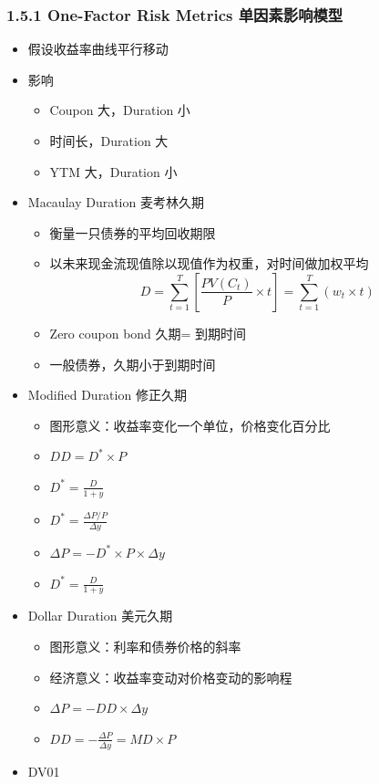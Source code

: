 \documentclass[a4paper,6pt,twoside,openany]{article}
\begin{document}
\subsubsection*{1.5.1 One-Factor Risk Metrics 单因素影响模型}
\begin{itemize}
\item 假设收益率曲线平行移动
\item 影响
  \begin{itemize}
  \item Coupon 大，Duration 小
  \item 时间长，Duration 大
  \item YTM 大，Duration 小
  \end{itemize}
\item Macaulay Duration 麦考林久期
  \begin{itemize}
  \item 衡量一只债券的平均回收期限
  \item 以未来现金流现值除以现值作为权重，对时间做加权平均
    $$D = \sum_{t=1}^T[\frac{PV(C_t)}{P} \times t] = \sum_{t=1}^T (w_t \times t)$$
  \item Zero coupon bond 久期= 到期时间
  \item 一般债券，久期小于到期时间
  \end{itemize}
\item Modified Duration 修正久期
  \begin{itemize}
  \item 图形意义：收益率变化一个单位，价格变化百分比
  \item $DD = D^* \times P$
  \item $D^* = \frac{D}{1 + y}$
  \item $D^* = \frac{\Delta P / P}{\Delta y}$
  \item $\Delta P = -D^* \times P \times \Delta y $
  \item $D^* = \frac{D}{1 + y}$
  \end{itemize}
\item Dollar Duration 美元久期
  \begin{itemize}
  \item 图形意义：利率和债券价格的斜率
  \item 经济意义：收益率变动对价格变动的影响程
  \item $\Delta P = -DD \times \Delta y $
  \item $DD = -\frac{\Delta P}{\Delta y} = MD \times P$
  \end{itemize}
\item DV01
  \begin{itemize}

\end{itemize}
\end{itemize}
\end{document}
